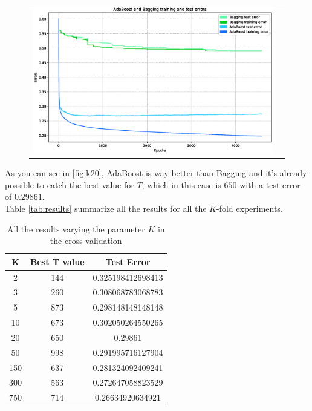 \begin{figure}[htpb]
\begin{tabular}{c c}
			\includegraphics[scale=0.2]{figs/report_k750.eps} \\
		\end{tabular}
\end{figure}
As you can see in \autoref{fig:k20}, AdaBoost is way better than Bagging and it's already possible to catch the best value for $T$, which in this case is $650$ with a test error of $0.29861$.\\
Table \autoref{tab:results} summarize all the results for all the $K$-fold experiments.

\begin{table}
\centering
\begin{tabular}{|c|c|c|}
	\hline
	K & Best T value & Test Error \\
	\hline
	2 & 144 & 0.325198412698413 \\
	\hline
	3 & 260 & 0.308068783068783 \\
	\hline
	5 & 873 & 0.298148148148148 \\
	\hline
	10 & 673 & 0.302050264550265 \\
	\hline
	20 & 650 & 0.29861 \\
	\hline
	50 & 998 & 0.291995716127904 \\
	\hline
	150 & 637 & 0.281324092409241 \\
	\hline
	300 & 563 & 0.272647058823529 \\
	\hline
	750 & 714 & 0.26634920634921 \\
	\hline
\end{tabular}
\caption{All the results varying the parameter $K$ in the cross-validation}
\label{tab:results}
\end{table}
